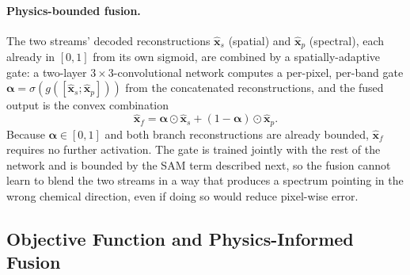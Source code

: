 \documentclass{article} %
\begin{document}
\paragraph{Physics-bounded fusion.} The two streams' decoded reconstructions $\hat{\mathbf{x}}_s$ (spatial) and $\hat{\mathbf{x}}_p$ (spectral), each already in $[0,1]$ from its own sigmoid, are combined by a spatially-adaptive gate: a two-layer $3{\times}3$-convolutional network computes a per-pixel, per-band gate $\boldsymbol{\alpha} = \sigma(g([\hat{\mathbf{x}}_s; \hat{\mathbf{x}}_p]))$ from the concatenated reconstructions, and the fused output is the convex combination
\begin{equation}
\hat{\mathbf{x}}_f = \boldsymbol{\alpha} \odot \hat{\mathbf{x}}_s + (1 - \boldsymbol{\alpha}) \odot \hat{\mathbf{x}}_p .
\end{equation}
Because $\boldsymbol{\alpha} \in [0,1]$ and both branch reconstructions are already bounded, $\hat{\mathbf{x}}_f$ requires no further activation. The gate is trained jointly with the rest of the network and is bounded by the SAM term described next, so the fusion cannot learn to blend the two streams in a way that produces a spectrum pointing in the wrong chemical direction, even if doing so would reduce pixel-wise error.

\subsection{Objective Function and Physics-Informed Fusion}
\label{sec:objective}
\end{document}
